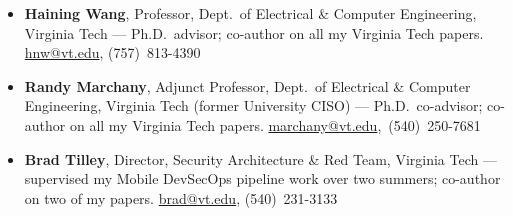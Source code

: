 \begin{itemize}
 \item \textbf{Haining Wang}, Professor, Dept.\ of Electrical \& Computer Engineering, Virginia Tech --- Ph.D.\ advisor; co-author on all my Virginia Tech papers. \href{mailto:hnw@vt.edu}{hnw@vt.edu}, \mbox{(757) 813-4390}
 \item \textbf{Randy Marchany}, Adjunct Professor, Dept.\ of Electrical \& Computer Engineering, Virginia Tech (former University CISO) --- Ph.D.\ co-advisor; co-author on all my Virginia Tech papers. \mbox{\href{mailto:marchany@vt.edu}{marchany@vt.edu}, (540) 250-7681}
 \item \textbf{Brad Tilley}, Director, Security Architecture \& Red Team, Virginia Tech --- supervised my Mobile DevSecOps pipeline work over two summers; co-author on two of my papers. \href{mailto:brad@vt.edu}{brad@vt.edu}, \mbox{(540) 231-3133}
\end{itemize}
